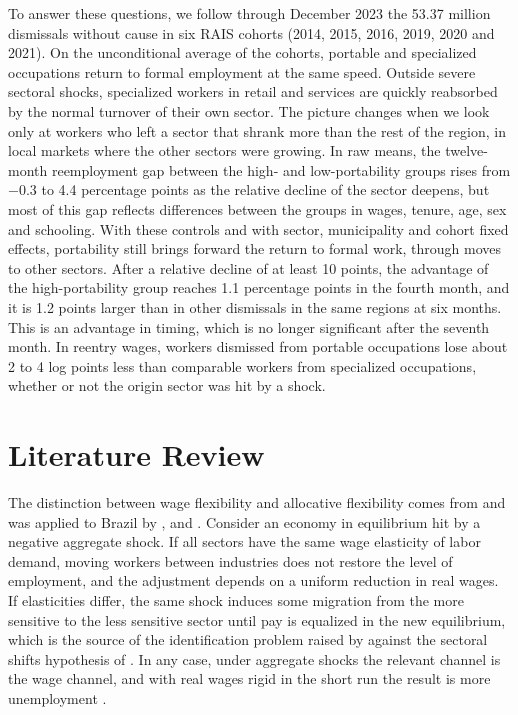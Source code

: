 \documentclass[11pt,a4paper]{article}
\let\citetorig\citet
\let\citeporig\citep
\renewcommand{\citet}[1]{{\color{citeblue}\citetorig{#1}}}
\renewcommand{\citep}[1]{{\color{citeblue}\citeporig{#1}}}
\let\secaoorig\section
\renewcommand{\section}{\clearpage\secaoorig}
\begin{document}
To answer these questions, we follow through December 2023 the 53.37 million dismissals without cause in six RAIS cohorts (2014, 2015, 2016, 2019, 2020 and 2021). On the unconditional average of the cohorts, portable and specialized occupations return to formal employment at the same speed. Outside severe sectoral shocks, specialized workers in retail and services are quickly reabsorbed by the normal turnover of their own sector. The picture changes when we look only at workers who left a sector that shrank more than the rest of the region, in local markets where the other sectors were growing. In raw means, the twelve-month reemployment gap between the high- and low-portability groups rises from $-0.3$ to 4.4 percentage points as the relative decline of the sector deepens, but most of this gap reflects differences between the groups in wages, tenure, age, sex and schooling. With these controls and with sector, municipality and cohort fixed effects, portability still brings forward the return to formal work, through moves to other sectors. After a relative decline of at least 10 points, the advantage of the high-portability group reaches 1.1 percentage points in the fourth month, and it is 1.2 points larger than in other dismissals in the same regions at six months. This is an advantage in timing, which is no longer significant after the seventh month. In reentry wages, workers dismissed from portable occupations lose about 2 to 4 log points less than comparable workers from specialized occupations, whether or not the origin sector was hit by a shock.

\section{Literature Review}

The distinction between wage flexibility and allocative flexibility comes from \citet{layard1991} and was applied to Brazil by \citet{amadeo1994}, \citet{barros1997td} and \citet{barros1997ppp}. Consider an economy in equilibrium hit by a negative aggregate shock. If all sectors have the same wage elasticity of labor demand, moving workers between industries does not restore the level of employment, and the adjustment depends on a uniform reduction in real wages. If elasticities differ, the same shock induces some migration from the more sensitive to the less sensitive sector until pay is equalized in the new equilibrium, which is the source of the identification problem raised by \citet{abraham1986} against the sectoral shifts hypothesis of \citet{lilien1982}. In any case, under aggregate shocks the relevant channel is the wage channel, and with real wages rigid in the short run the result is more unemployment \citep{shapiro1984, mortensen1994, pissarides2000}.
\end{document}
